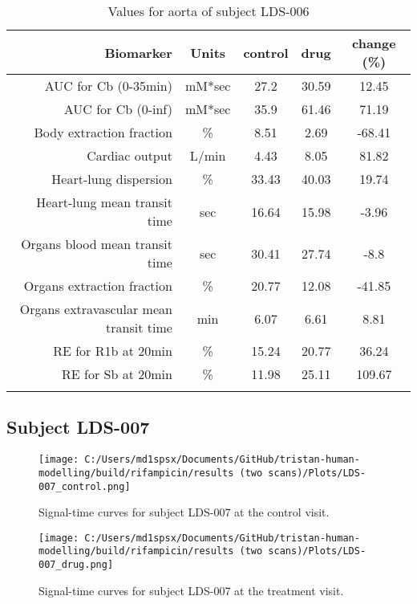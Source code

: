 \documentclass{epflreport}%
\begin{document}
\begin{longtable}{rcccc}%
\hline%
Biomarker&Units&control&drug&change (\%)\\%
\hline%
AUC for Cb (0{-}35min)&mM*sec&27.2&30.59&12.45\\%
AUC for Cb (0{-}inf)&mM*sec&35.9&61.46&71.19\\%
Body extraction fraction&\%&8.51&2.69&{-}68.41\\%
Cardiac output&L/min&4.43&8.05&81.82\\%
Heart{-}lung dispersion&\%&33.43&40.03&19.74\\%
Heart{-}lung mean transit time&sec&16.64&15.98&{-}3.96\\%
Organs blood mean transit time&sec&30.41&27.74&{-}8.8\\%
Organs extraction fraction&\%&20.77&12.08&{-}41.85\\%
Organs extravascular mean transit time&min&6.07&6.61&8.81\\%
RE for R1b at 20min&\%&15.24&20.77&36.24\\%
RE for Sb at 20min&\%&11.98&25.11&109.67\\%
\hline%
\caption{Values for aorta of subject LDS-006} \\%
\end{longtable}%
\clearpage%
\subsection{Subject LDS{-}007}%
\label{subsec:SubjectLDS{-}007}%

%


\begin{figure}[h!]%
\centering%
\texttt{[image: C:/Users/md1spsx/Documents/GitHub/tristan-human-modelling/build/rifampicin/results (two scans)/Plots/LDS-007\_control.png]}%
\caption{Signal{-}time curves for subject LDS{-}007 at the control visit.}%
\end{figure}

%


\begin{figure}[h!]%
\centering%
\texttt{[image: C:/Users/md1spsx/Documents/GitHub/tristan-human-modelling/build/rifampicin/results (two scans)/Plots/LDS-007\_drug.png]}%
\caption{Signal{-}time curves for subject LDS{-}007 at the treatment visit.}%
\end{figure}
\end{document}
